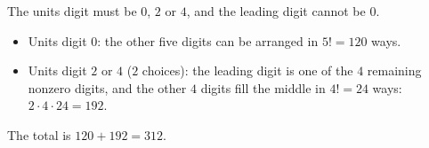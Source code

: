 The units digit must be $0$, $2$ or $4$, and the leading digit cannot be $0$.
\begin{itemize}
\item Units digit $0$: the other five digits can be arranged in $5!=120$ ways.
\item Units digit $2$ or $4$ ($2$ choices): the leading digit is one of the $4$ remaining nonzero digits, and the other $4$ digits fill the middle in $4!=24$ ways: $2\cdot4\cdot24=192$.
\end{itemize}
The total is $120+192=\boxed{312}$.
